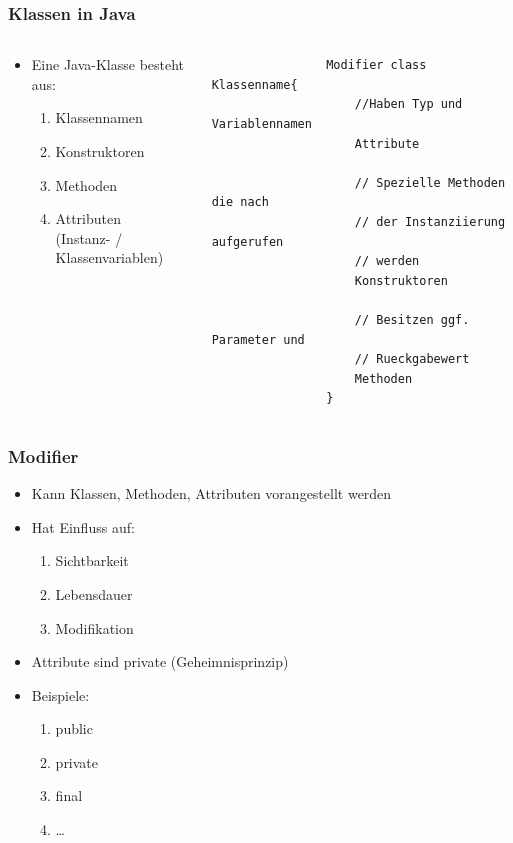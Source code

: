 \begin{frame}[fragile]
	\frametitle{Klassen in Java}
	\begin{columns}
		\begin{column}{0.5\textwidth}
			\small
			\begin{itemize}
			  \item Eine Java-Klasse besteht aus:\\
			  \begin{enumerate}
			  	\item Klassennamen
			  	\item Konstruktoren
			  	\item Methoden
			  	\item Attributen\\
			  	(Instanz- / Klassenvariablen)
			  \end{enumerate} 
			\end{itemize}
		\end{column}
		\begin{column}{0.5\textwidth}
			\begin{lstlisting}
				Modifier class Klassenname{
					//Haben Typ und Variablennamen
					Attribute
					
					// Spezielle Methoden die nach
					// der Instanziierung aufgerufen
					// werden
					Konstruktoren
					
					// Besitzen ggf. Parameter und 
					// Rueckgabewert
					Methoden
				}
			\end{lstlisting}
		\end{column}
	\end{columns}
\end{frame}

\begin{frame}[fragile]
	\frametitle{Modifier}
	\begin{itemize}
	  \item Kann Klassen, Methoden, 
	  Attributen vorangestellt werden
	  \item Hat Einfluss auf:
	  \begin{enumerate}
	  	\item Sichtbarkeit
	  	\item Lebensdauer
	  	\item Modifikation
	  \end{enumerate}
	  \item Attribute sind private (Geheimnisprinzip)
	  \item Beispiele:
	  \begin{enumerate}
	  	\item public
	  	\item private
	  	\item final
	  	\item \ldots
	  \end{enumerate}
	\end{itemize}
\end{frame}

